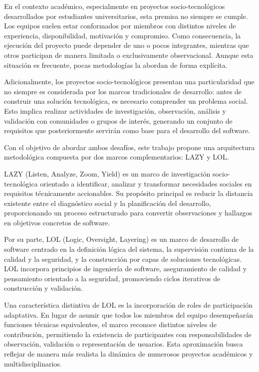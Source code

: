 \documentclass[14pt,a4paper,oneside]{extbook}
\begin{document}
En el contexto académico, especialmente en proyectos socio-tecnológicos desarrollados por estudiantes universitarios, esta premisa no siempre se cumple. Los equipos suelen estar conformados por miembros con distintos niveles de experiencia, disponibilidad, motivación y compromiso. Como consecuencia, la ejecución del proyecto puede depender de uno o pocos integrantes, mientras que otros participan de manera limitada o exclusivamente observacional. Aunque esta situación es frecuente, pocas metodologías la abordan de forma explícita.

Adicionalmente, los proyectos socio-tecnológicos presentan una particularidad que no siempre es considerada por los marcos tradicionales de desarrollo: antes de construir una solución tecnológica, es necesario comprender un problema social. Esto implica realizar actividades de investigación, observación, análisis y validación con comunidades o grupos de interés, generando un conjunto de requisitos que posteriormente servirán como base para el desarrollo del software.

Con el objetivo de abordar ambos desafíos, este trabajo propone una arquitectura metodológica compuesta por dos marcos complementarios: LAZY y LOL.

LAZY (Listen, Analyze, Zoom, Yield) es un marco de investigación socio-tecnológica orientado a identificar, analizar y transformar necesidades sociales en requisitos técnicamente accionables. Su propósito principal es reducir la distancia existente entre el diagnóstico social y la planificación del desarrollo, proporcionando un proceso estructurado para convertir observaciones y hallazgos en objetivos concretos de software.

Por su parte, LOL (Logic, Oversight, Layering) es un marco de desarrollo de software centrado en la definición lógica del sistema, la supervisión continua de la calidad y la seguridad, y la construcción por capas de soluciones tecnológicas. LOL incorpora principios de ingeniería de software, aseguramiento de calidad y pensamiento orientado a la seguridad, promoviendo ciclos iterativos de construcción y validación.

Una característica distintiva de LOL es la incorporación de roles de participación adaptativa. En lugar de asumir que todos los miembros del equipo desempeñarán funciones técnicas equivalentes, el marco reconoce distintos niveles de contribución, permitiendo la existencia de participantes con responsabilidades de observación, validación o representación de usuarios. Esta aproximación busca reflejar de manera más realista la dinámica de numerosos proyectos académicos y multidisciplinarios.
\end{document}
